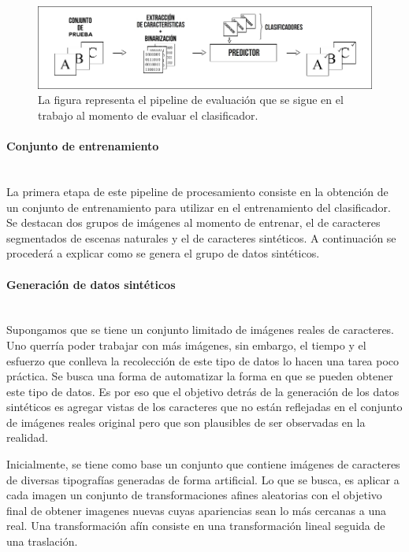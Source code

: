 			\begin{figure}[htbp]
				\centering
				\centerline{
					\includegraphics[scale=0.4]{img/pipeline_evaluacion.jpg}
				}
				\caption[Pipeline de evaluación]{La figura representa el pipeline de evaluación que se sigue en el trabajo al momento de evaluar el clasificador.}
				\label{fig: Pipeline evaluacion}
			\end{figure}
			
		\paragraph{Conjunto de entrenamiento} ~\\
		
			La primera etapa de este pipeline de procesamiento consiste en la obtención de un conjunto de entrenamiento para utilizar en el entrenamiento del clasificador. Se destacan dos grupos de imágenes al momento de entrenar, el de caracteres segmentados de escenas naturales y el de caracteres sintéticos. A continuación se procederá a explicar como se genera el grupo de datos sintéticos.
			

		\paragraph{Generación de datos sintéticos} ~\\

			Supongamos que se tiene un conjunto limitado de imágenes reales de caracteres. Uno querría poder trabajar con más imágenes, sin embargo, el tiempo y el esfuerzo que conlleva la recolección de este tipo de datos lo hacen una tarea poco práctica. Se busca una forma de automatizar la forma en que se pueden obtener este tipo de datos. Es por eso que el objetivo detrás de la generación de los datos sintéticos es agregar vistas de los caracteres que no están reflejadas en el conjunto de imágenes reales original pero que son plausibles de ser observadas en la realidad.
			
			Inicialmente, se tiene como base un conjunto que contiene imágenes de caracteres de diversas tipografías generadas de forma artificial. Lo que se busca, es aplicar a cada imagen un conjunto de transformaciones afines aleatorias con el objetivo final de obtener imagenes nuevas cuyas apariencias sean lo más cercanas a una real. Una transformación afín consiste en una transformación lineal seguida de una traslación. 
			
